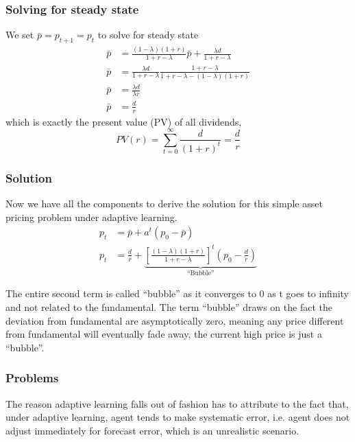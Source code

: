 \documentclass[twocolumn, fleqn]{article}
\begin{document}
			\subsubsection{Solving for steady state}
				We set $\bar{p} = p_{t+1}=p_t$ to solve for steady state
				\begin{align*}
					\bar{p} &= \frac{(1-\lambda)(1+r)}{1+r-\lambda} \bar{p} + \frac{\lambda d}{1+r-\lambda}\\
					\bar{p} &= \frac{\lambda d}{1+r-\lambda} \frac{1+r-\lambda}{1+r-\lambda - (1-\lambda)(1+r)}\\
					\bar{p} &=\frac{\lambda d}{\lambda r}\\[4pt]
					\bar{p} &=\frac{d}{r}
				\end{align*}
				which is exactly the present value (PV) of all dividends,
				\begin{equation*}
					PV(r) = \sum_{t=0}^{\infty} \frac{d}{(1+r)^t} = \frac{d}{r}
				\end{equation*}

			\subsubsection{Solution}
				Now we have all the components to derive the solution for this simple asset pricing problem under
				adaptive learning.
				\begin{align*}
					p_t & = \bar{p} + a^t (p_0-\bar{p})\\[4pt]
					p_t & = \frac{d}{r} +
					\underbrace{\left[\frac{(1-\lambda)(1+r)}{1+r-\lambda}\right]^t (p_0 -\frac{d}{r})}_{\text{``Bubble''}}
				\end{align*}

				The entire second term is called ``bubble'' as it converges to 0 as t goes to infinity and not
				related to the fundamental.
				The term ``bubble'' draws on the fact the deviation from fundamental are asymptotically zero,
				meaning any price different from fundamental will eventually fade away, the current high price is just a ``bubble''.

			\subsubsection{Problems}
				The reason adaptive learning falls out of fashion has to attribute to the fact that, under adaptive learning, agent tends to make systematic error, i.e. agent does not adjust immediately for forecast error, which is an unrealistic scenario.
\end{document}

